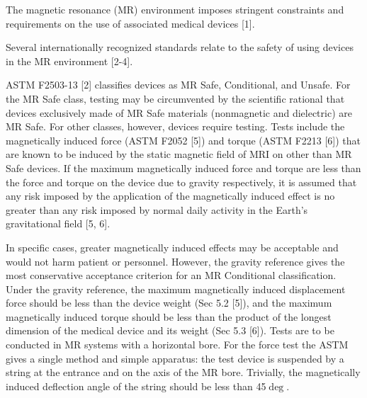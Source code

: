 

The magnetic resonance (MR) environment imposes
stringent constraints and requirements on the use of
associated medical devices [1]. 

Several internationally recognized standards relate to the safety of using devices in the
MR environment [2-4]. 

ASTM F2503-13 [2] classifies devices
as MR Safe, Conditional, and Unsafe. For the MR Safe class,
testing may be circumvented by the scientific rational that
devices exclusively made of MR Safe materials (nonmagnetic
and dielectric) are MR Safe. For other classes, however, devices
require testing. Tests include the magnetically induced force
(ASTM F2052 [5]) and torque (ASTM F2213 [6]) that are
known to be induced by the static magnetic field of MRI on
other than MR Safe devices. If the maximum magnetically
induced force and torque are less than the force and torque on
the device due to gravity respectively, it is assumed that any
risk imposed by the application of the magnetically induced
effect is no greater than any risk imposed by normal daily
activity in the Earth’s gravitational field [5, 6]. 

In specific cases,
greater magnetically induced effects may be acceptable and
would not harm patient or personnel. However, the gravity
reference gives the most conservative acceptance criterion for
an MR Conditional classification.
Under the gravity reference, the maximum magnetically
induced displacement force should be less than the device
weight (Sec 5.2 [5]), and the maximum magnetically induced
torque should be less than the product of the longest dimension
of the medical device and its weight (Sec 5.3 [6]). Tests are to
be conducted in MR systems with a horizontal bore.
For the force test the ASTM gives a single method and simple
apparatus: the test device is suspended by a string at the
entrance and on the axis of the MR bore. Trivially, the
magnetically induced deflection angle of the string should be
less than 45$\deg$.

